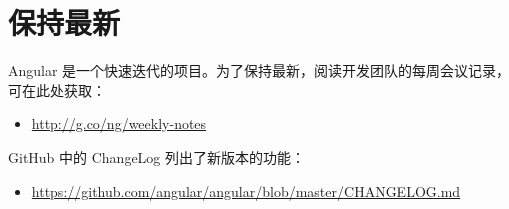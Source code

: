 \section{保持最新}


Angular 是一个快速迭代的项目。为了保持最新，阅读开发团队的每周会议记录，可在此处获取：

\begin{itemize}
  \item \url{http://g.co/ng/weekly-notes}
\end{itemize}


GitHub 中的 ChangeLog 列出了新版本的功能：

\begin{itemize}
  \item \url{https://github.com/angular/angular/blob/master/CHANGELOG.md}
\end{itemize}
